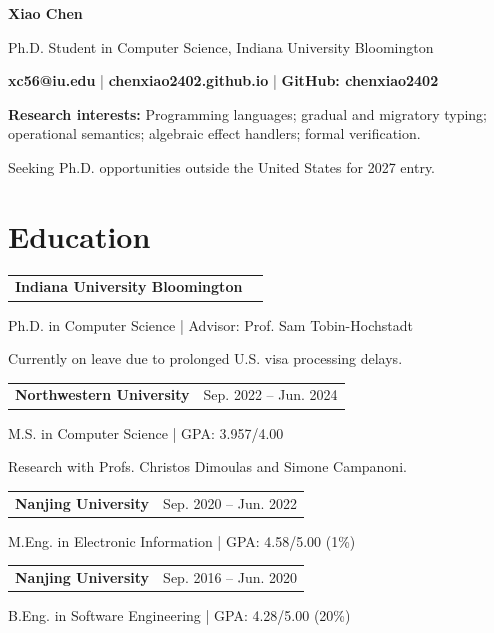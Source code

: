 \documentclass[letterpaper,11pt]{article}
\makeatletter
\newcommand{\cvheading}[2]{%
  \Needspace{4\baselineskip}%
  \begin{tabularx}{\linewidth}{@{}>{\raggedright\arraybackslash}X@{\hspace{1em}}r@{}}%
    \textbf{#1} & #2
  \end{tabularx}\par
}
\newcommand{\cvdetail}[1]{#1\par}
\newcommand{\entrygap}{\vspace{5pt}}
\newcommand{\vsp}{\vspace{6pt}}
\makeatother
\begin{document}
\small

\begin{center}
  {\LARGE\bfseries Xiao Chen}\par
  \vspace{4pt}
  Ph.D. Student in Computer Science, Indiana University Bloomington\par
  \vspace{3pt}
  \textbf{xc56@iu.edu}
  \enspace | \enspace
  \textbf{chenxiao2402.github.io}
  \enspace | \enspace
  \textbf{GitHub: chenxiao2402}
\end{center}


\textbf{Research interests:} Programming languages; gradual and migratory typing; operational semantics; algebraic effect handlers; formal verification.\par
\vspace{3pt}
Seeking Ph.D. opportunities outside the United States for 2027 entry.

\vsp

\section{Education}
\newlength{\educationdatewidth}
\settowidth{\educationdatewidth}{Sep. 2022 -- Jun. 2024}
\cvheading{Indiana University Bloomington}{\makebox[\educationdatewidth][l]{Sep. 2024 -- Present}}
\cvdetail{Ph.D. in Computer Science \enspace | \enspace Advisor: Prof. Sam Tobin-Hochstadt}
\cvdetail{Currently on leave due to prolonged U.S. visa processing delays.}
\entrygap
\cvheading{Northwestern University}{Sep. 2022 -- Jun. 2024}
\cvdetail{M.S. in Computer Science \enspace | \enspace GPA: 3.957/4.00}
\cvdetail{Research with Profs. Christos Dimoulas and Simone Campanoni.}
\entrygap
\cvheading{Nanjing University}{Sep. 2020 -- Jun. 2022}
\cvdetail{M.Eng. in Electronic Information \enspace | \enspace GPA: 4.58/5.00 (1\%)}
\entrygap
\cvheading{Nanjing University}{Sep. 2016 -- Jun. 2020}
\cvdetail{B.Eng. in Software Engineering \enspace | \enspace GPA: 4.28/5.00 (20\%)}

\vsp
\end{document}
